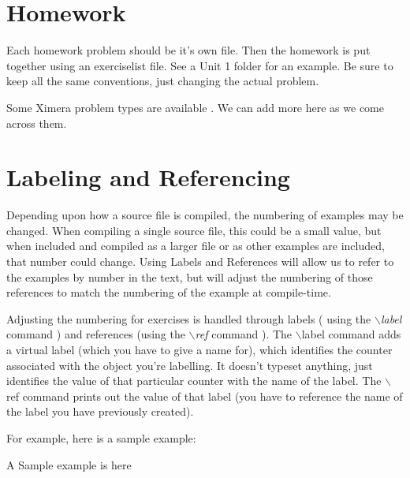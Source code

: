 \documentclass[nooutcomes]{ximera}
\begin{document}

\section{Homework}
Each homework problem should be it's own file.  Then the homework is put together using an exerciselist file.  See a Unit 1 folder for an example.  Be sure to keep all the same conventions, just changing the actual problem.  

Some Ximera problem types are available .  We can add more here as we come across them.


\section{Labeling and Referencing}

Depending upon how a source file is compiled, the numbering of examples may be changed. When compiling a single source file, this could be a small value,
but when included and compiled as a larger file or as other examples are included, that number could change. Using Labels and References will allow us to 
refer to the examples by number in the text, but will adjust the numbering of those references to match the numbering of the example at compile-time.


Adjusting the numbering for exercises is handled through labels ( using the $\backslash$\emph{label} command ) and references (using the $\backslash$\emph{ref} command ). 
The $\backslash$label command adds a virtual label (which you have to give a name for), which identifies the counter associated with the object you're labelling. It doesn't typeset anything, just identifies the value of that particular counter with the name of the label. 
The $\backslash$ref command prints out the value of that label (you have to reference the name of the label you have previously created).

For example, here is a sample example:
\begin{example}\label{example:SampleExample}
	A Sample example is here
\end{example}
\end{document}
